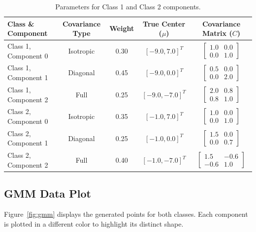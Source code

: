\documentclass[11pt,a4paper]{article}
\begin{document}
\begin{table}[ht]
\centering
\small
\begin{tabular}{@{}lcccc@{}}
\toprule
\textbf{Class \& Component} & \textbf{Covariance Type} & \textbf{Weight} & \textbf{True Center ($\mu$)} & \textbf{Covariance Matrix ($C$)} \\
\midrule
Class 1, Component 0 & Isotropic & 0.30 & $[-9.0, 7.0]^T$ & $\begin{bmatrix} 1.0 & 0.0 \\ 0.0 & 1.0 \end{bmatrix}$ \\[5pt]
Class 1, Component 1 & Diagonal  & 0.45 & $[-9.0, 0.0]^T$ & $\begin{bmatrix} 0.5 & 0.0 \\ 0.0 & 2.0 \end{bmatrix}$ \\[5pt]
Class 1, Component 2 & Full      & 0.25 & $[-9.0, -7.0]^T$ & $\begin{bmatrix} 2.0 & 0.8 \\ 0.8 & 1.0 \end{bmatrix}$ \\
\midrule
Class 2, Component 0 & Isotropic & 0.35 & $[-1.0, 7.0]^T$ & $\begin{bmatrix} 1.0 & 0.0 \\ 0.0 & 1.0 \end{bmatrix}$ \\[5pt]
Class 2, Component 1 & Diagonal  & 0.25 & $[-1.0, 0.0]^T$ & $\begin{bmatrix} 1.5 & 0.0 \\ 0.0 & 0.7 \end{bmatrix}$ \\[5pt]
Class 2, Component 2 & Full      & 0.40 & $[-1.0, -7.0]^T$ & $\begin{bmatrix} 1.5 & -0.6 \\ -0.6 & 1.0 \end{bmatrix}$ \\
\bottomrule
\end{tabular}
\caption{Parameters for Class 1 and Class 2 components.}
\label{tab:params}
\end{table}

\subsection{GMM Data Plot}
Figure~\ref{fig:gmm} displays the generated points for both classes. Each component is plotted in a different color to highlight its distinct shape.
\end{document}
